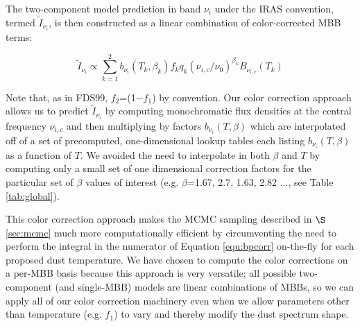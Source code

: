 \documentclass{emulateapj}
\newcommand{\IRAS}{{\it IRAS}}
\newcommand{\PLANCK}{{\it Planck}}
\begin{document}


The two-component model prediction in band $\nu_i$ under the IRAS convention, 
termed $\tilde{I}_{\nu_i}$, is then constructed as a linear combination of 
color-corrected MBB terms:

\begin{equation} \label{equ:iras}
\tilde{I}_{\nu_i} \propto \sum_{k=1}^{2} b_{\nu_i}(T_k, \beta_k) f_k q_k (\nu_{i,c}/\nu_0)^{\beta_k} B_{\nu_{i,c}}(T_k)
\end{equation}

Note that, as in FDS99, $f_2$=(1$-$$f_1$) by convention. Our color correction 
approach allows us to predict $\tilde{I}_{\nu_i}$ by computing monochromatic 
flux densities at the central frequency $\nu_{i,c}$ and then multiplying by 
factors $b_{\nu_i}(T, \beta)$ which are interpolated off of a set of 
precomputed, one-dimensional lookup tables each listing $b_{\nu_i}(T, \beta)$ 
as a function of $T$. We avoided the need to interpolate in both $\beta$ and 
$T$ by computing only a small set of one dimensional correction factors for the
particular set of $\beta$ values of interest (e.g. $\beta$=1.67, 2.7, 
1.63, 2.82 ..., see Table \ref{tab:global}).


This color correction approach makes the MCMC sampling described in 
$\S$\ref{sec:mcmc} much more computationally efficient by circumventing the 
need to perform the integral in the numerator of Equation \ref{equ:bpcorr} 
on-the-fly for each proposed dust temperature. We have chosen to compute the 
color corrections on a per-MBB basis because this approach is very 
versatile; all possible two-component (and single-MBB) models are linear 
combinations of MBBs, so we can apply all of our color correction machinery 
even when we allow parameters other than temperature (e.g. $f_1$) to vary and 
thereby modify the dust spectrum shape.

\end{document}
